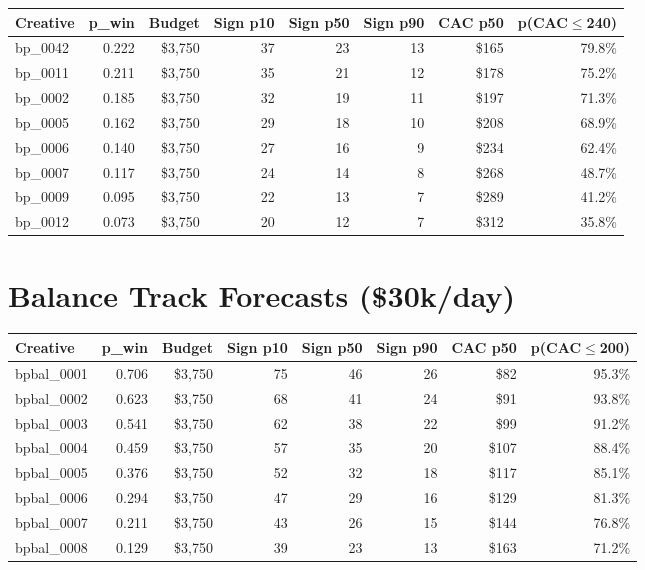 \documentclass[11pt,a4paper]{report}
\begin{document}
\begin{table}[H]
\centering
\small
{}
\begin{tabularx}{\textwidth}{l|r|r|r|r|r|r|r}
\toprule
\textbf{Creative} & \textbf{p\_win} & \textbf{Budget} & \textbf{Sign p10} & \textbf{Sign p50} & \textbf{Sign p90} & \textbf{CAC p50} & \textbf{p(CAC$\leq$240)} \\
\midrule
bp\_0042 & 0.222 & \$3,750 & 37 & 23 & 13 & \$165 & 79.8\% \\
bp\_0011 & 0.211 & \$3,750 & 35 & 21 & 12 & \$178 & 75.2\% \\
bp\_0002 & 0.185 & \$3,750 & 32 & 19 & 11 & \$197 & 71.3\% \\
bp\_0005 & 0.162 & \$3,750 & 29 & 18 & 10 & \$208 & 68.9\% \\
bp\_0006 & 0.140 & \$3,750 & 27 & 16 & 9 & \$234 & 62.4\% \\
bp\_0007 & 0.117 & \$3,750 & 24 & 14 & 8 & \$268 & 48.7\% \\
bp\_0009 & 0.095 & \$3,750 & 22 & 13 & 7 & \$289 & 41.2\% \\
bp\_0012 & 0.073 & \$3,750 & 20 & 12 & 7 & \$312 & 35.8\% \\
\bottomrule
\end{tabularx}
\end{table}

\section{Balance Track Forecasts (\$30k/day)}

\begin{table}[H]
\centering
\small
{}
\begin{tabularx}{\textwidth}{l|r|r|r|r|r|r|r}
\toprule
\textbf{Creative} & \textbf{p\_win} & \textbf{Budget} & \textbf{Sign p10} & \textbf{Sign p50} & \textbf{Sign p90} & \textbf{CAC p50} & \textbf{p(CAC$\leq$200)} \\
\midrule
bpbal\_0001 & 0.706 & \$3,750 & 75 & 46 & 26 & \$82 & 95.3\% \\
bpbal\_0002 & 0.623 & \$3,750 & 68 & 41 & 24 & \$91 & 93.8\% \\
bpbal\_0003 & 0.541 & \$3,750 & 62 & 38 & 22 & \$99 & 91.2\% \\
bpbal\_0004 & 0.459 & \$3,750 & 57 & 35 & 20 & \$107 & 88.4\% \\
bpbal\_0005 & 0.376 & \$3,750 & 52 & 32 & 18 & \$117 & 85.1\% \\
bpbal\_0006 & 0.294 & \$3,750 & 47 & 29 & 16 & \$129 & 81.3\% \\
bpbal\_0007 & 0.211 & \$3,750 & 43 & 26 & 15 & \$144 & 76.8\% \\
bpbal\_0008 & 0.129 & \$3,750 & 39 & 23 & 13 & \$163 & 71.2\% \\
\bottomrule
\end{tabularx}
\end{table}
\end{document}
